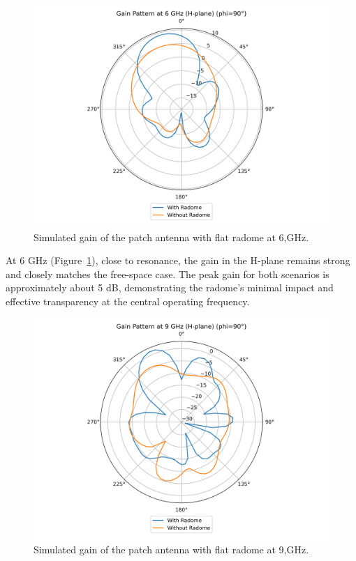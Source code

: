 \begin{figure}[H]
\centering
\includegraphics[width=1.0\textwidth]{figures/comparison_flat_radome/gainH_6_GHz.png}
\caption{Simulated gain of the patch antenna with flat radome at 6,GHz.}
\label{fig:res-flat-gainH6}
\end{figure}

At 6 GHz (Figure~\ref{fig:res-flat-gainH6}), close to resonance, the gain in the H-plane remains strong and closely matches the free-space case. The peak gain for both scenarios is approximately about 5 dB, demonstrating the radome's minimal impact and effective transparency at the central operating frequency.

\begin{figure}[H]
\centering
\includegraphics[width=1.0\textwidth]{figures/comparison_flat_radome/gainH_9_GHz.png}
\caption{Simulated gain of the patch antenna with flat radome at 9,GHz.}
\label{fig:res-flat-gainH9}
\end{figure}


